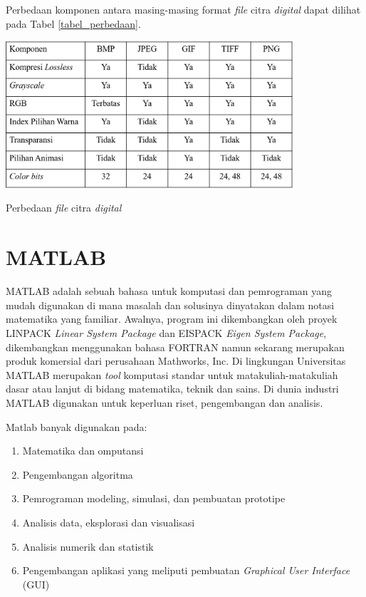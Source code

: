 	Perbedaan komponen antara masing-masing format \emph{file} citra \emph{digital} dapat dilihat pada Tabel \ref{tabel_perbedaan}. 
	\begin{table}[H]
		\centering
		\includegraphics[width=0.8\textwidth]{gambar/table_perbedaan}
		\caption{Perbedaan \emph{file} citra \emph{digital}}
		\label{tabel_perbedaan}
	\end{table}

\section{MATLAB}
MATLAB adalah sebuah bahasa untuk komputasi dan pemrograman yang mudah digunakan di mana masalah dan solusinya dinyatakan dalam notasi matematika yang familiar. Awalnya, program ini dikembangkan oleh proyek LINPACK \emph{Linear System Package} dan EISPACK \emph{Eigen System Package}, dikembangkan menggunakan bahasa FORTRAN namun sekarang merupakan produk komersial dari perusahaan Mathworks, Inc. Di lingkungan Universitas MATLAB merupakan \emph{tool} komputasi standar untuk matakuliah-matakuliah dasar atau lanjut di bidang matematika, teknik dan sains. Di dunia industri MATLAB digunakan untuk keperluan riset, pengembangan dan analisis.

Matlab banyak digunakan pada:
\begin{enumerate}
	\item Matematika dan omputansi
	\item Pengembangan algoritma
	\item Pemrograman modeling, simulasi, dan pembuatan prototipe
	\item Analisis data, eksplorasi dan visualisasi
	\item Analisis numerik dan statistik
	\item Pengembangan aplikasi yang meliputi pembuatan \emph{Graphical User Interface} (GUI) \cite{hermawati}
\end{enumerate}

